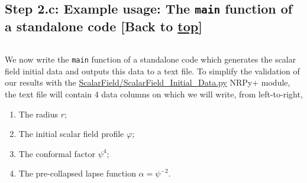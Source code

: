 \documentclass[landscape,letterpaper,10pt,english]{article}
\providecommand{\tightlist}{%
      \setlength{\itemsep}{0pt}\setlength{\parskip}{0pt}}
\begin{document}
    \hypertarget{step-2.c-example-usage-the-main-function-of-a-standalone-code-back-to-top}{%
\subsection{\texorpdfstring{Step 2.c: Example usage: The \texttt{main}
function of a standalone code {[}Back to
\hyperref[toc]{top}{]}}{Step 2.c: Example usage: The main function of a standalone code {[}Back to {]}}}\label{step-2.c-example-usage-the-main-function-of-a-standalone-code-back-to-top}}

\[\label{main_standalone}\]

We now write the \texttt{main} function of a standalone code which
generates the scalar field initial data and outputs this data to a text
file. To simplify the validation of our results with the
\href{../ScalarField/ScalarField_Initial_Data.py}{ScalarField/ScalarField\_Initial\_Data.py}
NRPy+ module, the text file will contain 4 data columns on which we will
write, from left-to-right,

\begin{enumerate}
\def\labelenumi{\arabic{enumi}.}
\tightlist
\item
  The radius \(r\);
\item
  The initial scalar field profile \(\varphi\);
\item
  The conformal factor \(\psi^{4}\);
\item
  The pre-collapsed lapse function \(\alpha = \psi^{-2}\).
\end{enumerate}
\end{document}
